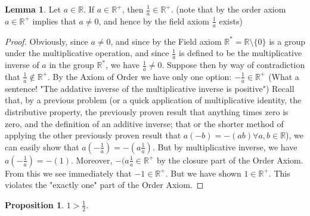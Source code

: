 \documentclass[11pt]{article}
\newcommand{\R}{\mathbb{R}}
\theoremstyle{definition}
\newtheorem{proposition}{Proposition}
\newtheorem{lemma}{Lemma}
\begin{document}
\begin{lemma}
Let $a\in \R$. If $a\in \R^+$, then $\frac{1}{a}\in \R^+$. (note that by the order axiom $a\in \R^+$ implies that $a\ne 0$, and hence by the field axiom $\frac{1}{a}$ exists)
\end{lemma}
\begin{proof}
Obviously, since $a\ne 0$, and since by the Field axiom $\R^* = \R \setminus \{0\}$ is a group under the multiplicative operation, and since $\frac{1}{a}$ is defined to be the multiplicative inverse of $a$ in the group $\R^*$, we have $\frac{1}{a} \ne 0$. Suppose then by way of contradiction that $\frac{1}{a} \not \in \R^+$. By the Axiom of Order we have only one option: $-\frac{1}{a}\in \R^+$ (What a sentence! "The addative inverse of the multiplicative inverse is positive") Recall that, by a previous problem (or a quick application of multiplicative identity, the distributive property, the previously proven result that anything times zero is zero, and the definition of an additive inverse; that or the shorter method of applying the other previously proven result that $a(-b) = -(ab)\forall a,b\in \R$), we can easily show that $a(-\frac{1}{a}) = -(a\frac{1}{a}) $. But by multiplicative inverse, we have $a(-\frac{1}{a}) = -(1)$. Moreover, $-(a\frac{1}{a} \in \R^+$ by the closure part of the Order Axiom. From this we see immediately that $-1\in \R^+$. But we have shown $1\in \R^+$. This violates the "exactly one" part of the Order Axiom. 
\end{proof}

\begin{proposition}
$ 1 > \frac{1}{2}$.
\end{proposition}
\end{document}
